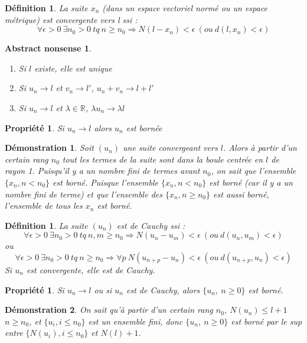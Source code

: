 \documentclass[a4paper, oneside]{report}
\theoremstyle{break}
\newtheorem{defi}[thm]{Définition}
\newtheorem{propr}[thm]{Propriété}
\newtheorem*{demo}{Démonstration}
\newtheorem*{absnon}{Abstract nonsense}
\newcommand{\R}{\mathbb{R}}
\newcommand{\ev}{espace vectoriel }
\begin{document}
\begin{defi}
La suite $x_n$ (dans un \ev normé ou un espace métrique) est convergente vers l ssi :
$$\forall \epsilon >0~ \exists n_0>0~tq~n\geq n_0 \Rightarrow N(l-x_n)<\epsilon~(ou~d(l,x_n)<\epsilon)$$
\end{defi}


\begin{absnon}
\begin{enumerate}
\item Si $l$ existe, elle est unique
\item Si $u_n \rightarrow l$ et $v_n\rightarrow l'$, $u_n+v_n \rightarrow l+l'$
\item Si $u_n \rightarrow l$ et $\lambda \in \R$, $\lambda u_n \rightarrow \lambda l$
\end{enumerate}
\end{absnon}


\begin{propr}
Si $u_n\rightarrow l$ alors $u_n$ est bornée
\end{propr}


\begin{demo}
Soit $(u_n)$ une suite convergeant vers $l$.
Alors à partir d'un certain rang $n_0$ tout les termes de la suite sont dans la boule centrée en $l$ de rayon 1.
Puisqu'il y a un nombre fini de termes avant $n_0$, on sait que l'ensemble $\{x_n, n < n_0\}$ est borné.
Puisque l'ensemble $\{x_n,  n < n_0\}$ est borné (car il y a un nombre fini de terme) et que l'ensemble des $\{x_n,  n \geq n_0\}$ est aussi borné, l'ensemble de tous les $x_n$ est borné.
\end{demo}


\begin{defi}

La suite $(u_n)$ est de Cauchy ssi :
$$\forall \epsilon >0~ \exists n_0>0~tq~n,m\geq n_0 \Rightarrow N(u_n-u_m)<\epsilon~(ou~d(u_n,u_m)<\epsilon)$$
ou
$$\forall \epsilon >0~ \exists n_0>0~tq~n\geq n_0 \Rightarrow \forall p~N(u_{n+p}-u_n)<\epsilon~(ou~d(u_{n+p},u_n)<\epsilon)$$
Si $u_n$ est convergente, elle est de Cauchy.
\end{defi}

\begin{propr}

Si $u_n \rightarrow l$ ou si $u_n$ est de Cauchy, alors $\{u_n,~n\geq 0 \}$ est borné.
\end{propr}


\begin{demo}
On sait qu'à partir d'un certain rang $n_0$, $N(u_n) \leq l+1$ $n\geq n_0$, et $\{u_i, i\leq n_0 \}$ est un ensemble fini, donc $\{u_n,~n\geq 0 \}$ est borné par le sup entre $\{N(u_i), i\leq n_0 \}$ et $N(l)+1$.
\end{demo}
\end{document}
